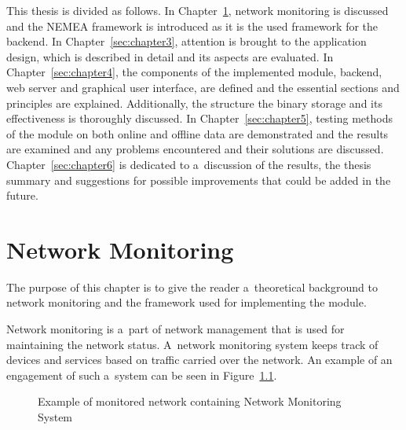 This thesis is divided as follows.
In Chapter~\ref{sec:chapter2}, network monitoring is discussed and the NEMEA framework is introduced as it is the used framework for the backend.
In Chapter~\ref{sec:chapter3}, attention is brought to the application design, which is described in detail and its aspects are evaluated.
In Chapter~\ref{sec:chapter4}, the components of the implemented module, backend, web server and graphical user interface, are defined and the essential sections and principles are explained.
Additionally, the structure the binary storage and its effectiveness is thoroughly discussed.
In Chapter~\ref{sec:chapter5}, testing methods of the module on both online and offline data are demonstrated and the results are examined
and any problems encountered and their solutions are discussed.
Chapter~\ref{sec:chapter6} is dedicated to a~discussion of the results, the
thesis summary and suggestions for possible improvements that could be added in the future.


\chapter{Network Monitoring}\label{sec:chapter2}
The purpose of this chapter is to give the reader a~theoretical background to network monitoring and the framework used 
for implementing the module.
 
Network monitoring is a~part of network management that is used for maintaining the network status.
A~network monitoring system keeps track of devices and services based on traffic carried over the network.
An example of an engagement of such a~system can be seen in Figure~\ref{fig:monitoring}.

\begin{figure}[ht]
   \begin{center}
		 \hfill
      \caption{Example of monitored network containing Network Monitoring System} \label{fig:monitoring}
	\end{center}
\end{figure}

